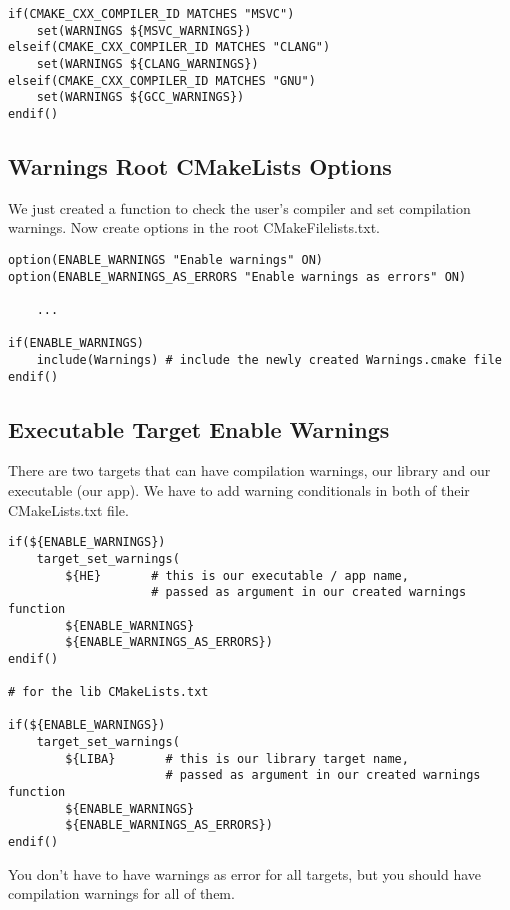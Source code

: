 \documentclass[openany]{report}
\begin{document}
\begin{verbatim}
if(CMAKE_CXX_COMPILER_ID MATCHES "MSVC")
    set(WARNINGS ${MSVC_WARNINGS})
elseif(CMAKE_CXX_COMPILER_ID MATCHES "CLANG")
    set(WARNINGS ${CLANG_WARNINGS})
elseif(CMAKE_CXX_COMPILER_ID MATCHES "GNU")
    set(WARNINGS ${GCC_WARNINGS})
endif()
\end{verbatim}


\subsection{Warnings Root CMakeLists Options}

We just created a function to check the user's compiler and set compilation warnings.
Now create options in the root CMakeFilelists.txt.

\begin{verbatim}
option(ENABLE_WARNINGS "Enable warnings" ON)
option(ENABLE_WARNINGS_AS_ERRORS "Enable warnings as errors" ON)

    ...

if(ENABLE_WARNINGS)
    include(Warnings) # include the newly created Warnings.cmake file
endif()
\end{verbatim}


\subsection{Executable Target Enable Warnings}

There are two targets that can have compilation warnings, our library and our executable (our app). We have to 
add warning conditionals in both of their CMakeLists.txt file.

\begin{verbatim}
if(${ENABLE_WARNINGS})
    target_set_warnings(
        ${HE}       # this is our executable / app name,
                    # passed as argument in our created warnings function
        ${ENABLE_WARNINGS}
        ${ENABLE_WARNINGS_AS_ERRORS})
endif()

# for the lib CMakeLists.txt

if(${ENABLE_WARNINGS})
    target_set_warnings(
        ${LIBA}       # this is our library target name,
                      # passed as argument in our created warnings function
        ${ENABLE_WARNINGS}
        ${ENABLE_WARNINGS_AS_ERRORS})
endif()
\end{verbatim}

You don't have to have warnings as error for all targets, but you should have compilation warnings for all of them.
\end{document}
